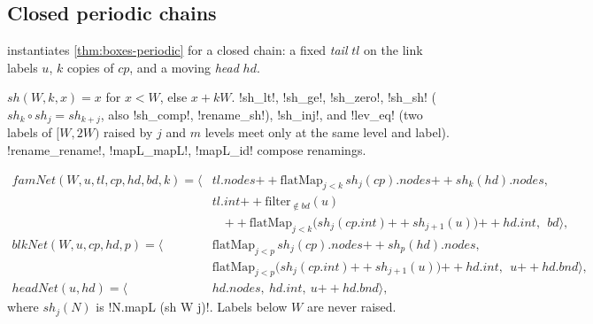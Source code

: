 {\subsection{Closed periodic chains}
 instantiates \cref{thm:boxes-periodic} for a closed chain: a fixed \emph{tail} $\mathit{tl}$ on the link labels $u$, $k$ copies of $\mathit{cp}$, and a moving \emph{head} $\mathit{hd}$.

\begin{definition}\label{def:boxes-sh}
$\mathit{sh}(W,k,x)=x$ for $x<W$, else $x+kW$. \lbx!sh_lt!, \lbx!sh_ge!, \lbx!sh_zero!, \lbx!sh_sh! ($\mathit{sh}_k\circ\mathit{sh}_j=\mathit{sh}_{k+j}$, also \lbx!sh_comp!, \lbx!rename_sh!), \lbx!sh_inj!, and \lbx!lev_eq! (two labels of $[W,2W)$ raised by $j$ and $m$ levels meet only at the same level and label). \lbx!rename_rename!, \lbx!mapL_mapL!, \lbx!mapL_id! compose renamings.
\end{definition}

\begin{definition}\label{def:boxes-famNet}
\begin{align*}
\mathit{famNet}(W,u,\mathit{tl},\mathit{cp},\mathit{hd},\mathit{bd},k)=\bigl\langle&\mathit{tl}.\mathit{nodes}\mathbin{+\!\!+}\mathrm{flatMap}_{j<k}\,\mathit{sh}_j(\mathit{cp}).\mathit{nodes}\mathbin{+\!\!+}\mathit{sh}_k(\mathit{hd}).\mathit{nodes},\\
&\mathit{tl}.\mathit{int}\mathbin{+\!\!+}\mathrm{filter}_{\notin\mathit{bd}}(u)\\
&\quad\mathbin{+\!\!+}\mathrm{flatMap}_{j<k}\bigl(\mathit{sh}_j(\mathit{cp}.\mathit{int})\mathbin{+\!\!+}\mathit{sh}_{j+1}(u)\bigr)\mathbin{+\!\!+}\mathit{hd}.\mathit{int},\ \ \mathit{bd}\bigr\rangle,\\
\mathit{blkNet}(W,u,\mathit{cp},\mathit{hd},p)=\bigl\langle&\mathrm{flatMap}_{j<p}\,\mathit{sh}_j(\mathit{cp}).\mathit{nodes}\mathbin{+\!\!+}\mathit{sh}_p(\mathit{hd}).\mathit{nodes},\\
&\mathrm{flatMap}_{j<p}\bigl(\mathit{sh}_j(\mathit{cp}.\mathit{int})\mathbin{+\!\!+}\mathit{sh}_{j+1}(u)\bigr)\mathbin{+\!\!+}\mathit{hd}.\mathit{int},\ \ u\mathbin{+\!\!+}\mathit{hd}.\mathit{bnd}\bigr\rangle,\\
\mathit{headNet}(u,\mathit{hd})=\bigl\langle&\mathit{hd}.\mathit{nodes},\ \mathit{hd}.\mathit{int},\ u\mathbin{+\!\!+}\mathit{hd}.\mathit{bnd}\bigr\rangle,
\end{align*}
where $\mathit{sh}_j(N)$ is \lbx!N.mapL (sh W j)!. Labels below $W$ are never raised.
\end{definition}

}
